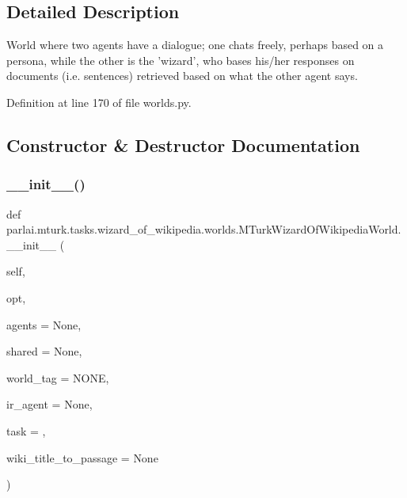 \subsection{Detailed Description}
\begin{DoxyVerb}World where two agents have a dialogue; one chats freely, perhaps based on a
persona, while the other is the 'wizard', who bases his/her responses on documents
(i.e. sentences) retrieved based on what the other agent says.
\end{DoxyVerb}
 

Definition at line 170 of file worlds.\+py.



\subsection{Constructor \& Destructor Documentation}
\mbox{\label{classparlai_1_1mturk_1_1tasks_1_1wizard__of__wikipedia_1_1worlds_1_1MTurkWizardOfWikipediaWorld_ae471a27f4c1d70786c2e56d99923cbbc}} 
\subsubsection{\texorpdfstring{\+\_\+\+\_\+init\+\_\+\+\_\+()}{\_\_init\_\_()}}
{\footnotesize\ttfamily def parlai.\+mturk.\+tasks.\+wizard\+\_\+of\+\_\+wikipedia.\+worlds.\+M\+Turk\+Wizard\+Of\+Wikipedia\+World.\+\_\+\+\_\+init\+\_\+\+\_\+ (\begin{DoxyParamCaption}\item[{}]{self,  }\item[{}]{opt,  }\item[{}]{agents = {\ttfamily None},  }\item[{}]{shared = {\ttfamily None},  }\item[{}]{world\+\_\+tag = {\ttfamily \textquotesingle{}NONE\textquotesingle{}},  }\item[{}]{ir\+\_\+agent = {\ttfamily None},  }\item[{}]{task = {\ttfamily \textquotesingle{}\textquotesingle{}},  }\item[{}]{wiki\+\_\+title\+\_\+to\+\_\+passage = {\ttfamily None} }\end{DoxyParamCaption})}




